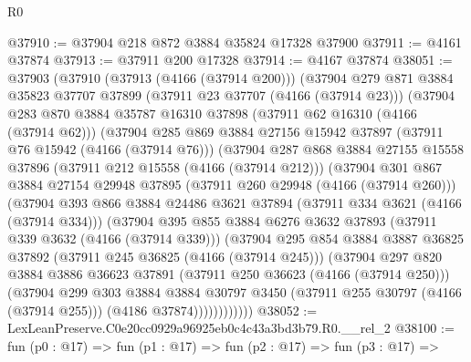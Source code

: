 \begin{lexlean}{R0}
\begin{coremodule}
@37910 := @37904 @218 @872 @3884 @35824 @17328 @37900
@37911 := @4161 @37874
@37913 := @37911 @200 @17328
@37914 := @4167 @37874
@38051 := @37903
    (@37910
      (@37913 (@4166 (@37914 @200)))
      (@37904
        @279
        @871
        @3884
        @35823
        @37707
        @37899
        (@37911 @23 @37707 (@4166 (@37914 @23)))
        (@37904
          @283
          @870
          @3884
          @35787
          @16310
          @37898
          (@37911 @62 @16310 (@4166 (@37914 @62)))
          (@37904
            @285
            @869
            @3884
            @27156
            @15942
            @37897
            (@37911 @76 @15942 (@4166 (@37914 @76)))
            (@37904
              @287
              @868
              @3884
              @27155
              @15558
              @37896
              (@37911 @212 @15558 (@4166 (@37914 @212)))
              (@37904
                @301
                @867
                @3884
                @27154
                @29948
                @37895
                (@37911 @260 @29948 (@4166 (@37914 @260)))
                (@37904
                  @393
                  @866
                  @3884
                  @24486
                  @3621
                  @37894
                  (@37911 @334 @3621 (@4166 (@37914 @334)))
                  (@37904
                    @395
                    @855
                    @3884
                    @6276
                    @3632
                    @37893
                    (@37911 @339 @3632 (@4166 (@37914 @339)))
                    (@37904
                      @295
                      @854
                      @3884
                      @3887
                      @36825
                      @37892
                      (@37911 @245 @36825 (@4166 (@37914 @245)))
                      (@37904
                        @297
                        @820
                        @3884
                        @3886
                        @36623
                        @37891
                        (@37911 @250 @36623 (@4166 (@37914 @250)))
                        (@37904
                          @299
                          @303
                          @3884
                          @3884
                          @30797
                          @3450
                          (@37911 @255 @30797 (@4166 (@37914 @255)))
                          (@4186 @37874))))))))))))
@38052 := LexLeanPreserve.C0e20cc0929a96925eb0c4c43a3bd3b79.R0.__rel_2
@38100 := fun (p0 : @17) =>
  fun (p1 : @17) =>
  fun (p2 : @17) =>
  fun (p3 : @17) =>

\end{coremodule}
\end{lexlean}
